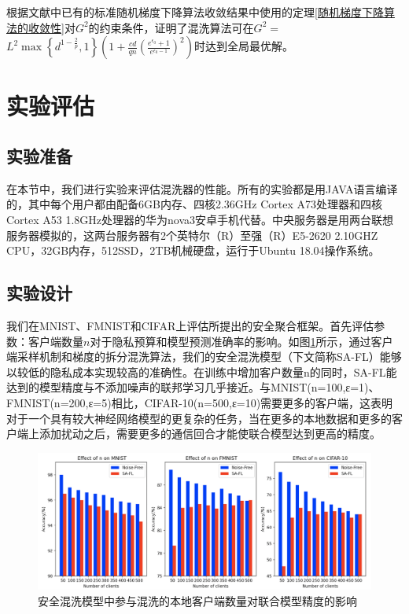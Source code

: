 根据文献中已有的标准随机梯度下降算法收敛结果中使用的定理\ref{随机梯度下降算法的收敛性}对$G^{2}$的约束条件，证明了混洗算法可在$G^{2}=$ $L^{2} \max \left\{d^{1-\frac{2}{p}}, 1\right\}\left(1+\frac{c d}{q n}\left(\frac{e^{\epsilon_{0}}+1}{e^{\epsilon_{0}-1}}\right)^{2}\right)$时达到全局最优解。

\section{实验评估}
\subsection{实验准备}
在本节中，我们进行实验来评估混洗器的性能。所有的实验都是用JAVA语言编译的，其中每个用户都由配备6GB内存、四核2.36GHz Cortex A73处理器和四核Cortex A53 1.8GHz处理器的华为nova3安卓手机代替。中央服务器是用两台联想服务器模拟的，这两台服务器有2个英特尔（R）至强（R）E5-2620 2.10GHZ CPU，32GB内存，512SSD，2TB机械硬盘，运行于Ubuntu 18.04操作系统。

\subsection{实验设计}

我们在MNIST、FMNIST和CIFAR上评估所提出的安全聚合框架。首先评估参数：客户端数量$n$对于隐私预算和模型预测准确率的影响。如图\ref{fig:安全混洗模型中参与混洗的本地客户端数量对联合模型精度的影响}所示，通过客户端采样机制和梯度的拆分混洗算法，我们的安全混洗模型（下文简称SA-FL）能够以较低的隐私成本实现较高的准确性。在训练中增加客户数量n的同时，SA-FL能达到的模型精度与不添加噪声的联邦学习几乎接近。与MNIST(n=100,ε=1)、FMNIST(n=200,ε=5)相比，CIFAR-10(n=500,ε=10)需要更多的客户端，这表明对于一个具有较大神经网络模型的更复杂的任务，当在更多的本地数据和更多的客户端上添加扰动之后，需要更多的通信回合才能使联合模型达到更高的精度。

\begin{figure}[!hbt]
\centering
  	\includegraphics[scale=0.37]{fig2/C5/SA-FL}%
	\caption{安全混洗模型中参与混洗的本地客户端数量对联合模型精度的影响}
  	\label{fig:安全混洗模型中参与混洗的本地客户端数量对联合模型精度的影响} 
\end{figure}

